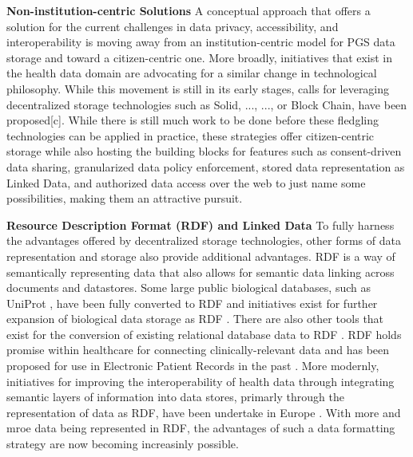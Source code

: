 \documentclass[a4paper,11pt]{article}
\begin{document}
\textbf{Non-institution-centric Solutions}
A conceptual approach that offers a solution for the current challenges in data privacy, accessibility, and interoperability is moving away from an institution-centric model for PGS data storage and toward a citizen-centric one. 
More broadly, initiatives that exist in the health data domain are advocating for a similar change in technological philosophy. 
While this movement is still in its early stages, calls for leveraging decentralized storage technologies such as Solid, ..., ..., or Block Chain, have been proposed[c]. 
While there is still much work to be done before these fledgling technologies can be applied in practice, these strategies offer citizen-centric storage while also hosting the building blocks for features such as consent-driven data sharing, granularized data policy enforcement, stored data representation as Linked Data, and authorized data access over the web to just name some possibilities, making them an attractive pursuit. 

\textbf{Resource Description Format (RDF) and Linked Data}
To fully harness the advantages offered by decentralized storage technologies, other forms of data representation and storage also provide additional advantages.
RDF is a way of semantically representing data that also allows for semantic data linking across documents and datastores.
Some large public biological databases, such as UniProt \cite{theuniprotconsortium_uniprot_2017}, have been fully converted to RDF and initiatives exist for further expansion of biological data storage as RDF \cite{sib_swiss_institute_of_bioinformatics_rdf_group_members_sib_2024}.
There are also other tools that exist for the conversion of existing relational database data to RDF \cite{jupp_ebi_2014}.
RDF holds promise within healthcare for connecting clinically-relevant data and has been proposed for use in Electronic Patient Records in the past \cite{lindemann_resource_2008}.
More modernly, initiatives for improving the interoperability of health data through integrating semantic layers of information into data stores, primarly through the representation of data as RDF, have been undertake in Europe \cite{van_der_horst_bridging_2023}.
With more and mroe data being represented in RDF, the advantages of such a data formatting strategy are now becoming increasinly possible.
\end{document}

